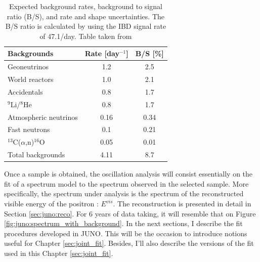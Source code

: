 \documentclass[../main.tex]{subfiles}
\begin{document}
\begin{table}[ht]
  \centering
  \begin{tabular}{l|c|c}
    \hline
    Backgrounds           & Rate [day$^{-1}$] & B/S [\%] \\
    \hline
    Geoneutrinos          & 1.2               & 2.5 \\
    World reactors        & 1.0               & 2.1 \\
    Accidentals           & 0.8               & 1.7 \\
    $^9$Li/$^8$He         & 0.8               & 1.7 \\
    Atmospheric neutrinos & 0.16              & 0.34 \\
    Fast neutrons         & 0.1               & 0.21 \\
    $^{13}$C($\alpha$,n)$^{16}$O & 0.05       & 0.01 \\
    \hline
    Total backgrounds     & 4.11              & 8.7 \\
    \hline
  \end{tabular}
  \caption{Expected background rates, background to signal ratio (B/S), and rate and shape uncertainties. The B/S ratio is calculated by using the IBD signal rate of 47.1/day. Table taken from \cite{abusleme_potential_2024}}
  \label{tab:juno:res_bg}
\end{table}

Once a sample is obtained, the oscillation analysis will consist essentially on the fit of a spectrum model to the spectrum observed in the selected sample. More specifically, the spectrum under analysis is the spectrum of the reconstructed visible energy of the positron : $E^{vis}$.
The reconstruction is presented in detail in Section \ref{sec:juno:reco}. For 6 years of data taking, it will resemble that on Figure \ref{fig:juno:spectrum_with_background}. In the next sections, I describe the fit procedures developed in JUNO. This will be the occasion to introduce notions useful for Chapter \ref{sec:joint_fit}. Besides, I'll also describe the versions of the fit used in this Chapter \ref{sec:joint_fit}.

%
%
%
\end{document}

